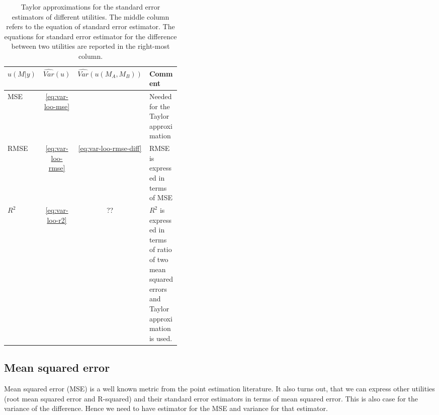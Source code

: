 \documentclass{article}
\begin{document}
\begin{table}[!htb]
    \centering
    \begin{tabular}{l c c p{0.4\linewidth}}
    \toprule
    $u(M | y)$ & $\widehat{Var}(u)$  & $\widehat{Var}(u(M_A, M_B))$ & Comment \\ \midrule
    MSE & \eqref{eq:var-loo-mse} &  & Needed for the Taylor approximation\\
    RMSE  & \eqref{eq:var-loo-rmse} & \eqref{eq:var-loo-rmse-diff} & RMSE is expressed in terms of MSE\\
    $R^2$ & \eqref{eq:var-loo-r2} & ?? & $R^2$ is expressed in terms of ratio of two mean squared errors and Taylor approximation is used.
    \end{tabular}
    \caption{Taylor approximations for the standard error estimators of different utilities. The middle column refers to the equation of standard error estimator. The equations for standard error estimator for the difference between two utilities are reported in the right-most column.}
    \label{tbl:se-approximations}
\end{table}


\subsection{Mean squared error}
Mean squared error (MSE) is a well known metric from the point estimation literature. It also turns out, that we can express other utilities (root mean squared error and R-squared) and their standard error estimators in terms of mean squared error. This is also case for the variance of the difference. Hence we need to have estimator for the MSE and variance for that estimator.
\end{document}
